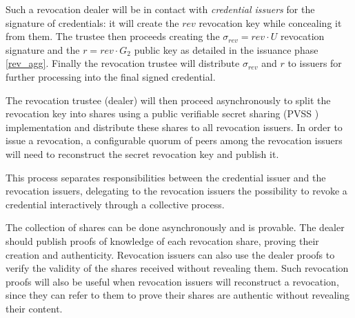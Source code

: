 Such a revocation dealer will be in contact with \textit{credential
  issuers} for the signature of credentials: it will create the $rev$
revocation key while concealing it from them. The trustee then
proceeds creating the $\sigma_{rev} = rev \cdot U$ revocation
signature and the $r = rev \cdot G_2$ public key as detailed in the
issuance phase \eqref{rev_agg}. Finally the revocation trustee will
distribute $\sigma_{rev}$ and $r$ to issuers for further processing
into the final signed credential.

The revocation trustee (dealer) will then proceed asynchronously to
split the revocation key into shares using a public verifiable secret
sharing (PVSS \cite{pvss}) implementation and distribute these shares
to all revocation issuers. In order to issue a revocation, a
configurable quorum of peers among the revocation issuers will need to
reconstruct the secret revocation key and publish it.

This process separates responsibilities between the credential issuer
and the revocation issuers, delegating to the revocation issuers the
possibility to revoke a credential interactively through a collective
process.

The collection of shares can be done asynchronously and is provable.
The dealer should publish proofs of knowledge of each revocation
share, proving their creation and authenticity. Revocation issuers can
also use the dealer proofs to verify the validity of the shares
received without revealing them. Such revocation proofs will also be
useful when revocation issuers will reconstruct a revocation, since
they can refer to them to prove their shares are authentic without
revealing their content.

